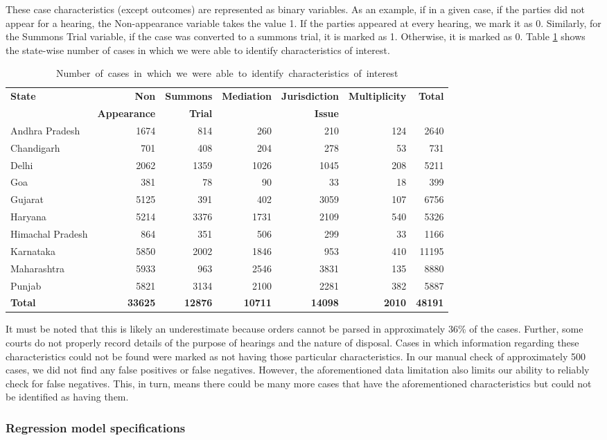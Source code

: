 These case characteristics (except outcomes) are represented as
binary variables. As an example, if in a given case, if the parties
did not appear for a hearing, the Non-appearance variable takes the
value 1. If the parties appeared at every hearing, we mark it as
0. Similarly, for the Summons Trial variable, if the case was
converted to a summons trial, it is marked as 1. Otherwise, it is
marked as 0. Table \ref{tab:case_chars} shows the state-wise number of
cases in which we were able to identify characteristics of interest.

{\footnotesize \centering
  \begin{longtable}{@{}lrrrrrr@{}}
  \caption{\mbox{Number of cases in which we were able to identify
    characteristics of interest}}
  \label{tab:case_chars}\\
  \toprule
  \textbf{State} & \textbf{Non} & \textbf{Summons} & \textbf{Mediation} & \textbf{Jurisdiction} & \textbf{Multiplicity} & \textbf{Total} \\
   & \textbf{Appearance} & \textbf{Trial} & & \textbf{Issue} & & \\
  \midrule
  \endhead
  Andhra Pradesh & 1674 & 814 & 260 & 210 & 124 & 2640 \\
  Chandigarh & 701 & 408 & 204 & 278 & 53 & 731 \\
  Delhi & 2062 & 1359 & 1026 & 1045 & 208 & 5211 \\
  Goa & 381 & 78 & 90 & 33 & 18 & 399 \\
  Gujarat & 5125 & 391 & 402 & 3059 & 107 & 6756 \\
  Haryana & 5214 & 3376 & 1731 & 2109 & 540 & 5326 \\
  Himachal Pradesh & 864 & 351 & 506 & 299 & 33 & 1166 \\
  Karnataka & 5850 & 2002 & 1846 & 953 & 410 & 11195 \\
  Maharashtra & 5933 & 963 & 2546 & 3831 & 135 & 8880 \\
  Punjab & 5821 & 3134 & 2100 & 2281 & 382 & 5887 \\
  \midrule
  \textbf{Total} & \textbf{33625} & \textbf{12876} & \textbf{10711} &
  \textbf{14098} & \textbf{2010} & \textbf{48191}\\\bottomrule
\end{longtable}
}

It must be noted that this is likely an underestimate because orders cannot be parsed in approximately 36\% of the cases. Further, some courts do not properly record details of the purpose of hearings and the nature of disposal. Cases in which information regarding these characteristics could not be found were marked as not having those particular characteristics. In our manual check of approximately 500 cases, we did not find any false positives or false negatives. However, the aforementioned data limitation also limits our ability to reliably check for false negatives. This, in turn, means there could be many more cases that have the aforementioned characteristics but could not be identified as having them.

\subsubsection{Regression model specifications}
\label{sec:model-selection}


